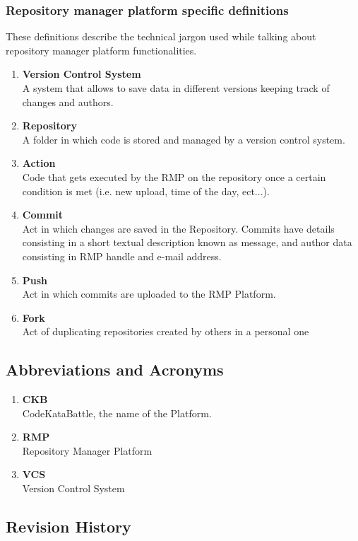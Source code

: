 \subsubsection[short]{Repository manager platform specific definitions}
These definitions describe the technical jargon used while talking about repository manager platform functionalities.
\begin{enumerate}[label=$\bullet$]
    \item \textbf{Version Control System}\\A system that allows to save data in different versions keeping track of changes and authors.
    \item \textbf{Repository}\\A folder in which code is stored and managed by a version control system.
    \item \textbf{Action}\\Code that gets executed by the RMP on the repository once a certain condition is met (i.e. new upload, time of the day, ect...).
    \item \textbf{Commit}\\Act in which changes are saved in the Repository. Commits have details consisting in a short textual description known as message, and author data consisting in RMP handle and e-mail address.
    \item \textbf{Push}\\Act in which commits are uploaded to the RMP Platform.
    \item \textbf{Fork}\\Act of duplicating repositories created by others in a personal one
\end{enumerate}
\subsection{Abbreviations and Acronyms}
\begin{enumerate}[label=$\bullet$]
    \item \textbf{CKB}\\CodeKataBattle, the name of the Platform.
    \item \textbf{RMP}\\Repository Manager Platform
    \item \textbf{VCS}\\Version Control System
\end{enumerate}

\subsection{Revision History}

